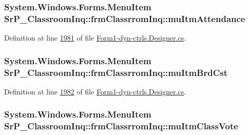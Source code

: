 \hypertarget{class_sr_p___classroom_inq_1_1frm_classrrom_inq_afdc8efd0fa2025280bc6a44b8d71afc2}{
\subsubsection[{mu\-Itm\-Attendance}]{\setlength{\rightskip}{0pt plus 5cm}\-System.\-Windows.\-Forms.\-Menu\-Item {\bf \-Sr\-P\-\_\-\-Classroom\-Inq\-::frm\-Classrrom\-Inq\-::mu\-Itm\-Attendance}}}
\label{class_sr_p___classroom_inq_1_1frm_classrrom_inq_afdc8efd0fa2025280bc6a44b8d71afc2}


\-Definition at line \hyperlink{_form1-dyn-ctrls_8_designer_8cs_source_l01981}{1981} of file \hyperlink{_form1-dyn-ctrls_8_designer_8cs_source}{\-Form1-\/dyn-\/ctrls.\-Designer.\-cs}.

\hypertarget{class_sr_p___classroom_inq_1_1frm_classrrom_inq_abafec6e5f39b80917c9c53ddd9075e7d}{
\subsubsection[{mu\-Itm\-Brd\-Cst}]{\setlength{\rightskip}{0pt plus 5cm}\-System.\-Windows.\-Forms.\-Menu\-Item {\bf \-Sr\-P\-\_\-\-Classroom\-Inq\-::frm\-Classrrom\-Inq\-::mu\-Itm\-Brd\-Cst}}}
\label{class_sr_p___classroom_inq_1_1frm_classrrom_inq_abafec6e5f39b80917c9c53ddd9075e7d}


\-Definition at line \hyperlink{_form1-dyn-ctrls_8_designer_8cs_source_l01982}{1982} of file \hyperlink{_form1-dyn-ctrls_8_designer_8cs_source}{\-Form1-\/dyn-\/ctrls.\-Designer.\-cs}.

\hypertarget{class_sr_p___classroom_inq_1_1frm_classrrom_inq_af00bacaa276c0e6c98e046aa01f73696}{
\subsubsection[{mu\-Itm\-Class\-Vote}]{\setlength{\rightskip}{0pt plus 5cm}\-System.\-Windows.\-Forms.\-Menu\-Item {\bf \-Sr\-P\-\_\-\-Classroom\-Inq\-::frm\-Classrrom\-Inq\-::mu\-Itm\-Class\-Vote}}}
\label{class_sr_p___classroom_inq_1_1frm_classrrom_inq_af00bacaa276c0e6c98e046aa01f73696}


